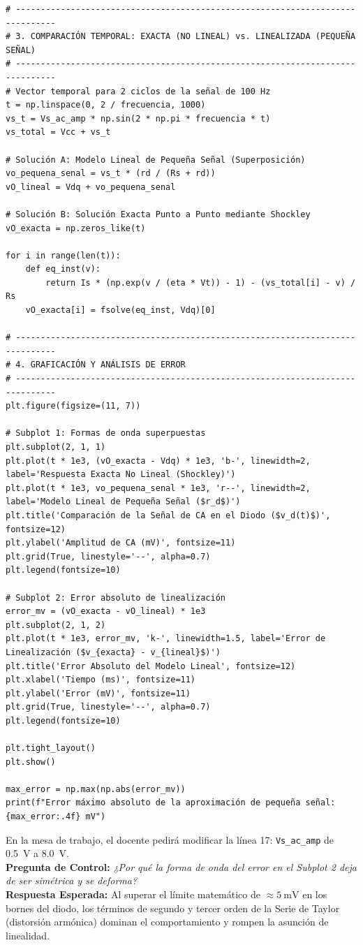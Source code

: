 \documentclass[11pt, a4paper]{article}
\begin{document}
\begin{lstlisting}
# ------------------------------------------------------------------------------
# 3. COMPARACIÓN TEMPORAL: EXACTA (NO LINEAL) vs. LINEALIZADA (PEQUEÑA SEÑAL)
# ------------------------------------------------------------------------------
# Vector temporal para 2 ciclos de la señal de 100 Hz
t = np.linspace(0, 2 / frecuencia, 1000)
vs_t = Vs_ac_amp * np.sin(2 * np.pi * frecuencia * t)
vs_total = Vcc + vs_t

# Solución A: Modelo Lineal de Pequeña Señal (Superposición)
vo_pequena_senal = vs_t * (rd / (Rs + rd))
vO_lineal = Vdq + vo_pequena_senal

# Solución B: Solución Exacta Punto a Punto mediante Shockley
vO_exacta = np.zeros_like(t)

for i in range(len(t)):
    def eq_inst(v):
        return Is * (np.exp(v / (eta * Vt)) - 1) - (vs_total[i] - v) / Rs
    vO_exacta[i] = fsolve(eq_inst, Vdq)[0]

# ------------------------------------------------------------------------------
# 4. GRAFICACIÓN Y ANÁLISIS DE ERROR
# ------------------------------------------------------------------------------
plt.figure(figsize=(11, 7))

# Subplot 1: Formas de onda superpuestas
plt.subplot(2, 1, 1)
plt.plot(t * 1e3, (vO_exacta - Vdq) * 1e3, 'b-', linewidth=2, label='Respuesta Exacta No Lineal (Shockley)')
plt.plot(t * 1e3, vo_pequena_senal * 1e3, 'r--', linewidth=2, label='Modelo Lineal de Pequeña Señal ($r_d$)')
plt.title('Comparación de la Señal de CA en el Diodo ($v_d(t)$)', fontsize=12)
plt.ylabel('Amplitud de CA (mV)', fontsize=11)
plt.grid(True, linestyle='--', alpha=0.7)
plt.legend(fontsize=10)

# Subplot 2: Error absoluto de linealización
error_mv = (vO_exacta - vO_lineal) * 1e3
plt.subplot(2, 1, 2)
plt.plot(t * 1e3, error_mv, 'k-', linewidth=1.5, label='Error de Linealización ($v_{exacta} - v_{lineal}$)')
plt.title('Error Absoluto del Modelo Lineal', fontsize=12)
plt.xlabel('Tiempo (ms)', fontsize=11)
plt.ylabel('Error (mV)', fontsize=11)
plt.grid(True, linestyle='--', alpha=0.7)
plt.legend(fontsize=10)

plt.tight_layout()
plt.show()

max_error = np.max(np.abs(error_mv))
print(f"Error máximo absoluto de la aproximación de pequeña señal: {max_error:.4f} mV")
\end{lstlisting}

\begin{aviso}
En la mesa de trabajo, el docente pedirá modificar la línea 17: \texttt{Vs\_ac\_amp} de \qty{0.5}{\volt} a \qty{8.0}{\volt}.\\
\textbf{Pregunta de Control:} \textit{¿Por qué la forma de onda del error en el Subplot 2 deja de ser simétrica y se deforma?} \\
\textbf{Respuesta Esperada:} Al superar el límite matemático de $\approx \qty{5}{\milli\volt}$ en los bornes del diodo, los términos de segundo y tercer orden de la Serie de Taylor (distorsión armónica) dominan el comportamiento y rompen la asunción de linealidad.
\end{aviso}
\end{document}
